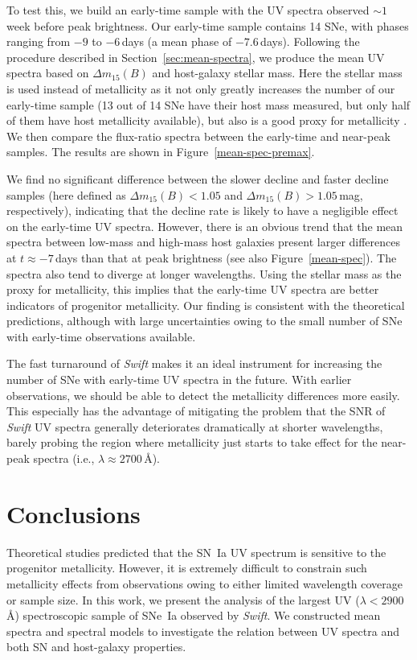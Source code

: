 \documentclass[useAMS,usenatbib]{mn2e}
\newcommand{\deltam}{\ensuremath{\Delta m_{15}}}
\begin{document}
To test this, we build an early-time sample with the UV spectra observed $\sim1$\,week before peak brightness. Our early-time sample contains 14 SNe, with phases ranging from $-9$ to $-6$\,days (a mean phase of $-7.6$\,days). Following the procedure described in Section~\ref{sec:mean-spectra}, we produce the mean UV spectra based on $\deltam(B)$ and host-galaxy stellar mass. Here the stellar mass is used instead of metallicity as it not only greatly increases the number of our early-time sample (13 out of 14 SNe have their host mass measured, but only half of them have host metallicity available), but also is a good proxy for metallicity \citep[e.g.,][]{2004ApJ...613..898T}. We then compare the flux-ratio spectra between the early-time and near-peak samples. The results are shown in Figure~\ref{mean-spec-premax}.

We find no significant difference between the slower decline and faster decline samples (here defined as $\deltam(B)<1.05$ and $\deltam(B)>1.05$\,mag, respectively), indicating that the decline rate is likely to have a negligible effect on the early-time UV spectra. However, there is an obvious trend that the mean spectra between low-mass and high-mass host galaxies present larger differences at $t \approx -7$\,days than that at peak brightness (see also Figure~\ref{mean-spec}). The spectra also tend to diverge at longer wavelengths. Using the stellar mass as the proxy for metallicity, this implies that the early-time UV spectra are better indicators of progenitor metallicity. Our finding is consistent with the theoretical predictions, although with large uncertainties owing to the small number of SNe with early-time observations available. 

The fast turnaround of {\it Swift} makes it an ideal instrument for increasing the number of SNe with early-time UV spectra in the future. With earlier observations, we should be able to detect the metallicity differences more easily. This especially has the advantage of mitigating the problem that the SNR of {\it Swift} UV spectra generally deteriorates dramatically at shorter wavelengths, barely probing the region where metallicity just starts to take effect for the near-peak spectra (i.e., $\lambda \approx 2700$\,\AA).

\section{Conclusions}
\label{sec:conclusion}
Theoretical studies predicted that the SN~Ia UV spectrum is sensitive to the progenitor metallicity. However, it is extremely difficult to constrain such metallicity effects from observations owing to either limited wavelength coverage or sample size. In this work, we present the analysis of the largest UV ($\lambda<2900$\,\AA) spectroscopic sample of SNe~Ia observed by {\it Swift}. We constructed mean spectra and spectral models to investigate the relation between UV spectra and both SN and host-galaxy properties.
\end{document}
